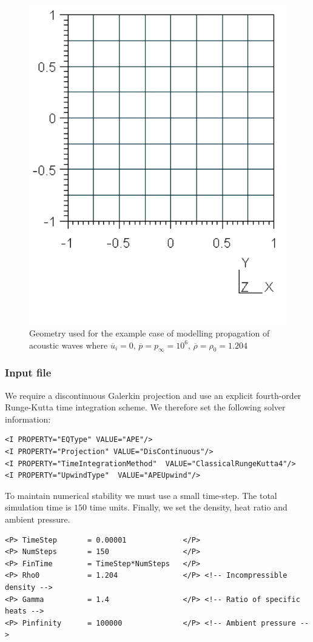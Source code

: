 \begin{figure}
	\centering
	\includegraphics[width=0.5\linewidth]{img/APE_Geometry.png}
	\caption{Geometry used for the example case of modelling propagation of
	acoustic waves where $\overline{u}_i = 0, \, \overline{p}=p_{\infty}=10^6, \, \overline{\rho} = \rho_0 = 1.204$}
	\label{f:apesolver:geometry}
\end{figure}

\subsubsection{Input file}
We require a discontinuous Galerkin projection and use an explicit
fourth-order Runge-Kutta time integration scheme. We therefore set the following
solver information:
\begin{lstlisting}[style=XmlStyle]
<I PROPERTY="EQType" VALUE="APE"/> 
<I PROPERTY="Projection" VALUE="DisContinuous"/>
<I PROPERTY="TimeIntegrationMethod"  VALUE="ClassicalRungeKutta4"/>
<I PROPERTY="UpwindType"  VALUE="APEUpwind"/>
\end{lstlisting}

To maintain numerical stability we must use a small time-step. The total
simulation time is $150$ time units. Finally, we set the density, heat ratio and
ambient pressure.
\begin{lstlisting}[style=XMLStyle]
<P> TimeStep       = 0.00001             </P>
<P> NumSteps       = 150                 </P>
<P> FinTime        = TimeStep*NumSteps   </P>
<P> Rho0           = 1.204               </P> <!-- Incompressible density -->
<P> Gamma          = 1.4                 </P> <!-- Ratio of specific heats -->
<P> Pinfinity      = 100000              </P> <!-- Ambient pressure -->
\end{lstlisting}

